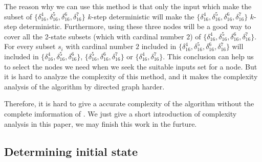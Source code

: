 The reason why we can use this method is that only the input which make the subset of $\{\delta_{16}^4,\delta_{16}^5,\delta_{16}^6,\delta_{16}^7\}$ $k$-step deterministic will make the $\{\delta_{16}^4,\delta_{16}^5,\delta_{16}^6,\delta_{16}^7\}$ $k$-step deterministic. Furthermore, using these three nodes will be a good way to cover all the 2-state subsets (which with cardinal number $2$) of $\{\delta_{16}^4,\delta_{16}^5,\delta_{16}^6,\delta_{16}^7\}$. For every subset $s_i$ with cardinal number $2$ included in $\{\delta_{16}^4,\delta_{16}^5,\delta_{16}^6,\delta_{16}^7\}$ will included in $\{\delta_{16}^4,\delta_{16}^5,\delta_{16}^6\}$, $\{\delta_{16}^5,\delta_{16}^6,\delta_{16}^7\}$ or $\{\delta_{16}^4,\delta_{16}^7\}$. This conclusion can help us to select the nodes we need when we seek the suitable inputs set for a node. But it is hard to analyze the complexity of this method, and it makes the complexity analysis of the algorithm by directed graph harder.

Therefore, it is hard to give a accurate complexity of the algorithm without the complete imformation of \BCNs. We just give a short introduction of complexity analysis in this paper, we may finish this work in the furture.
\subsection{Determining initial state}

